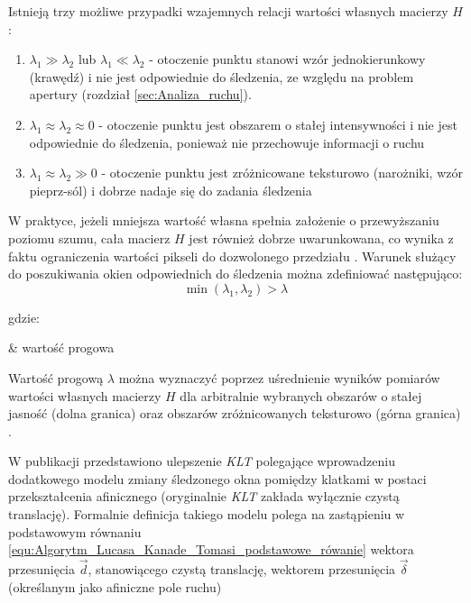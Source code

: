 Istnieją trzy możliwe przypadki wzajemnych relacji wartości własnych macierzy $H$:
\begin{enumerate}
	\item $\lambda_1 \gg \lambda_2$ lub $\lambda_1 \ll \lambda_2$ - otoczenie punktu stanowi wzór jednokierunkowy (krawędź) i nie jest odpowiednie do śledzenia, ze względu na problem apertury (rozdział \ref{sec:Analiza_ruchu}).
	\item $\lambda_1 \approx \lambda_2 \approx 0$ - otoczenie punktu jest obszarem o stałej intensywności i nie jest odpowiednie do śledzenia, ponieważ  nie przechowuje informacji o ruchu
	\item $\lambda_1 \approx \lambda_2 \gg 0$ - otoczenie punktu jest zróżnicowane teksturowo (narożniki, wzór pieprz-sól) i dobrze nadaje się do zadania śledzenia
\end{enumerate}

W praktyce, jeżeli mniejsza wartość własna spełnia założenie o przewyższaniu poziomu szumu, cała macierz $H$ jest również dobrze uwarunkowana, co wynika z faktu ograniczenia wartości pikseli do dozwolonego przedziału \cite{Tomasi1991}. Warunek służący do poszukiwania okien odpowiednich do śledzenia można zdefiniować następująco:
\begin{equation}
\label{equ:Algorytm_Lucasa_Kanade_Tomasi_poszukiwanie_punktow}
	\min (\lambda_1, \lambda_2) > \lambda
\end{equation}

\noindent
gdzie:
\begin{conditions}
	\lambda & wartość progowa \\
\end{conditions}

Wartość progową $\lambda$ można wyznaczyć poprzez uśrednienie wyników pomiarów wartości własnych macierzy $H$ dla arbitralnie wybranych obszarów o stałej jasność (dolna granica) oraz obszarów zróżnicowanych teksturowo (górna granica) \cite{Tomasi1991}.

W publikacji \cite{Shi1994} przedstawiono ulepszenie \textit{KLT} polegające wprowadzeniu dodatkowego modelu zmiany śledzonego okna pomiędzy klatkami w postaci przekształcenia afinicznego (oryginalnie \textit{KLT} zakłada wyłącznie czystą translację). Formalnie definicja takiego modelu polega na zastąpieniu w podstawowym równaniu \ref{equ:Algorytm_Lucasa_Kanade_Tomasi_podstawowe_rówanie} wektora przesunięcia $\vec{d}$, stanowiącego czystą translację, wektorem przesunięcia $\vec{\delta}$ (określanym jako afiniczne pole ruchu) \cite{Shi1994}


